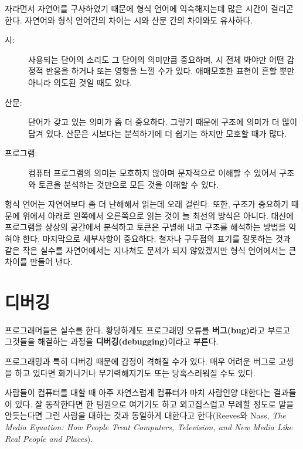\documentclass[10pt]{book}
\begin{document}
자라면서 자연어를 구사하였기 때문에 형식 언어에 익숙해지는데 많은 시간이 걸리곤 한다.  자연어와 형식 언어간의 차이는 시와 산문 간의 차이와도 유사하다. 
  

\begin{description}

\item[시:] 사용되는 단어의 소리도 그 단어의 의미만큼 중요하며, 시 전체
  봐야만 어떤 감정적 반응을 하거나 또는 영향을 느낄 수가 있다.
  애매모호한 표현이 흔할 뿐만 아니라 의도된 것일 때도 있다.

\item[산문:] 단어가 갖고 있는 의미가 좀 더 중요하다. 그렇기 때문에
  구조에 의미가 더 많이 담겨 있다.  산문은 시보다는 분석하기에 더
  쉽기는 하지만 모호할 때가 많다.

\item[프로그램:] 컴퓨터 프로그램의 의미는 모호하지 않아며 문자적으로
  이해할 수 있어서 구조와 토큰을 분석하는 것만으로 모든 것을 이해할 수
  있다.

\end{description}

형식 언어는 자연어보다 좀 더 난해해서 읽는데 오래 걸린다. 또한, 구조가
중요하기 때문에 위에서 아래로 왼쪽에서 오른쪽으로 읽는 것이 늘 최선의
방식은 아니다.  대신에 프로그램을 상상의 공간에서 분석하고 토큰은
구별해 내고 구조를 해석하는 방법을 익혀야 한다.  마지막으로 세부사항이
중요하다.  철자나 구두점의 표기를 잘못하는 것과 같은 작은 실수를
자연어에서는 지나쳐도 문제가 되지 않았겠지만 형식 언어에서는 큰 차이를
만들어 낸다.


\section{디버깅}

프로그래머들은 실수를 한다.  황당하게도 프로그래밍 오류를 {\bf
  버그(bug)}라고 부르고 그것들을 해결하는 과정을 {\bf
  디버깅(debugging)}이라고 부른다.

프로그래밍과 특히 디버깅 때문에 감정이 격해질 수가 있다.  매우 어려운
버그로 고생을 하고 있다면 화가나거나 무기력해지기도 또는 당혹스러워질
수도 있다.

사람들이 컴퓨터를 대할 때 아주 자연스럽게 컴퓨터가 마치 사람인양
대한다는 결과들이 있다. 잘 동작한다면 한 팀원으로 여기기도 하고
외고집스럽고 무례할 정도로 말을 안듯는다면 그런 사람을 대하는 것과
동일하게 대한다고 한다(Reeves와 Nass, {\it The Media Equation: How
  People Treat Computers, Television, and New Media Like Real People
  and Places}).
\end{document}
